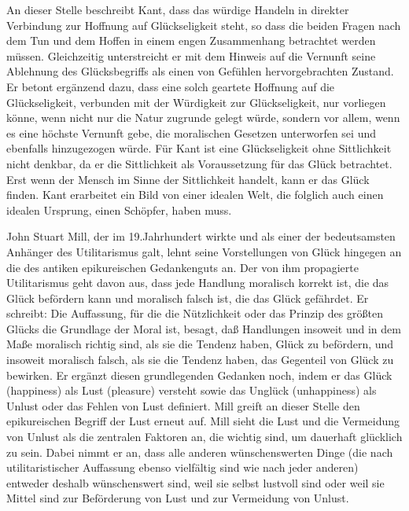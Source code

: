 An dieser Stelle beschreibt Kant, dass das würdige Handeln in direkter Verbindung zur Hoffnung auf Glückseligkeit steht, so dass die beiden Fragen nach dem Tun und dem Hoffen in einem engen Zusammenhang betrachtet werden müssen. 
Gleichzeitig unterstreicht er mit dem Hinweis auf die Vernunft seine Ablehnung des Glücksbegriffs als einen von Gefühlen hervorgebrachten Zustand. 
Er betont ergänzend dazu, dass eine solch geartete Hoffnung auf die Glückseligkeit, verbunden mit der Würdigkeit zur Glückseligkeit, nur vorliegen könne, wenn nicht nur die Natur zugrunde gelegt würde, sondern vor allem, wenn es eine höchste Vernunft gebe, die moralischen Gesetzen unterworfen sei und ebenfalls hinzugezogen würde.
Für Kant ist eine Glückseligkeit ohne Sittlichkeit nicht denkbar, da er die Sittlichkeit als Voraussetzung für das Glück betrachtet. 
Erst wenn der Mensch im Sinne der Sittlichkeit handelt, kann er das Glück finden. 
Kant erarbeitet ein Bild von einer idealen Welt, die folglich auch einen idealen Ursprung, einen Schöpfer, haben muss\cite[S.\,526]{IK73}.

John Stuart Mill, der im 19.Jahrhundert wirkte und als einer der bedeutsamsten Anhänger des Utilitarismus galt, lehnt seine Vorstellungen von Glück hingegen an die des antiken epikureischen Gedankenguts an. 
Der von ihm propagierte Utilitarismus geht davon aus, dass jede Handlung moralisch korrekt ist, die das Glück befördern kann und moralisch falsch ist, die das Glück gefährdet. 
Er schreibt: \glqq Die Auffassung, für die die Nützlichkeit oder das Prinzip des größten Glücks die Grundlage der Moral ist, besagt, daß Handlungen insoweit und in dem Maße moralisch richtig sind, als sie die Tendenz haben, Glück zu befördern, und insoweit moralisch falsch, als sie die Tendenz haben, das Gegenteil von Glück zu bewirken.\grqq{} \cite[S.\,13]{JM94}
Er ergänzt diesen grundlegenden Gedanken noch, indem er das Glück (happiness) als Lust (pleasure) versteht sowie das Unglück (unhappiness) als Unlust oder das Fehlen von Lust definiert. 
Mill greift an dieser Stelle den epikureischen Begriff der \glqq Lust\grqq{} erneut auf. 
Mill sieht die Lust und die Vermeidung von Unlust als die zentralen Faktoren an, die wichtig sind, um dauerhaft glücklich zu sein. 
Dabei nimmt er an, dass \glqq alle anderen wünschenswerten Dinge (die nach utilitaristischer Auffassung ebenso vielfältig sind wie nach jeder anderen) entweder deshalb wünschenswert sind, weil sie selbst lustvoll sind oder weil sie Mittel sind zur Beförderung von Lust und zur Vermeidung von Unlust.\grqq{} \cite[S.\,13]{JM94}

